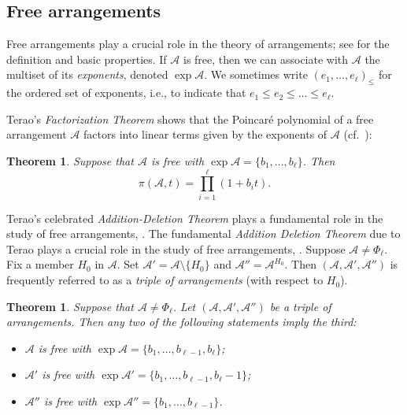 \documentclass[12pt]{amsart}
\newcommand\CA{{\mathscr A}}
\numberwithin{equation}{section}
\theoremstyle{plain}
\newtheorem{theorem}[equation]{Theorem}
\theoremstyle{definition}
\begin{document}
\subsection{Free arrangements}
\label{ssect:free}

Free arrangements play a crucial role in the theory of arrangements;
see \cite[\S 4]{orlikterao:arrangements} for the definition and
basic properties. If $\CA$ is free, then
we can associate with $\CA$ the multiset of its \emph{exponents},
denoted $\exp \CA$. We sometimes write 
$(e_1,\ldots,e_\ell)_\le$ for the ordered set of exponents, i.e., to indicate that 
$e_1 \leq e_2 \leq \ldots \leq e_\ell$.

Terao's \emph{Factorization Theorem}
\cite{terao:freefactors} shows
that the Poincar\'e polynomial
of a free arrangement $\CA$
factors into linear terms
given by the exponents of $\CA$
(cf.\ \cite[Thm.\ 4.137]{orlikterao:arrangements}):

\begin{theorem}
	\label{thm:freefactors}
	Suppose that
	$\CA$ is free with $\exp \CA = \{ b_1, \ldots , b_\ell\}$.
	Then
	\[
	\pi(\CA,t) = \prod_{i=1}^\ell (1 + b_i t).
	\]
\end{theorem}


Terao's celebrated \emph{Addition-Deletion Theorem}
\cite{terao:freeI} plays a
fundamental role in the study of free arrangements,
\cite[Thm.\ 4.51]{orlikterao:arrangements}. The fundamental \emph{Addition Deletion Theorem} 
due to Terao  \cite{terao:freeI} plays a 
crucial role in the study of free arrangements, 
\cite[Thm.~4.51]{orlikterao:arrangements}. 
Suppose $\CA \neq \Phi_\ell$. Fix a member $H_0$ in $\CA$. Set $\CA' = \CA \setminus \{H_0\}$ and  $\CA'' = \CA^{H_0}$. Then $(\CA, \CA', \CA'')$ is frequently referred to as a \emph{triple of arrangements} (with respect to $H_0$). 


\begin{theorem}
	\label{thm:add-del}
	Suppose that $\CA \ne \Phi_\ell$.
	Let  $(\CA, \CA', \CA'')$ be a triple of arrangements. Then any
	two of the following statements imply the third:
	\begin{itemize}
		\item[(i)] $\CA$ is free with $\exp \CA = \{ b_1, \ldots , b_{\ell -1}, b_\ell\}$;
		\item[(ii)] $\CA'$ is free with $\exp \CA' = \{ b_1, \ldots , b_{\ell -1}, b_\ell-1\}$;
		\item[(iii)] $\CA''$ is free with $\exp \CA'' = \{ b_1, \ldots , b_{\ell -1}\}$.
	\end{itemize}
\end{theorem}
\end{document}
